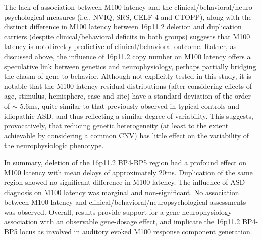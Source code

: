 \documentclass{article}
\begin{document}
\medskip

The lack of association between M100 latency and the clinical/behavioral/neuro-psychological measures (i.e., NVIQ, SRS, CELF-4 and CTOPP), along with the distinct difference in M100 latency between 16p11.2 deletion and duplication carriers (despite clinical/behavioral deficits in both groups) suggests that M100 latency is not directly predictive of clinical/behavioral outcome. Rather, as discussed above, the influence of 16p11.2 copy number on M100 latency offers a speculative link between genetics and neurophysiology, perhaps partially bridging the chasm of gene to behavior. Although not explicitly tested in this study, it is notable that the M100 latency residual distributions (after considering effects of age, stimulus, hemisphere, case and site) have a standard deviation of the order of $\sim$ 5.6ms, quite similar to that previously observed in typical controls and idiopathic ASD, and thus reflecting a similar degree of variability. This suggests, provocatively, that reducing genetic heterogeneity (at least to the extent achievable by considering a common CNV) has little effect on the variability of the neurophysiologic phenotype.  

\medskip

In summary, deletion of the 16p11.2 BP4-BP5 region had a profound effect on M100 latency with mean delays of approximately 20ms.  Duplication of the same region showed no significant difference in M100 latency. The influence of ASD diagnosis on M100 latency was marginal and non-significant. No association between M100 latency and clinical/behavioral/neuropsychological assessments was observed. Overall, results provide support for a gene-neurophysiology association with an observable gene-dosage effect, and implicate the 16p11.2 BP4-BP5 locus as involved in auditory evoked M100 response component generation.  
\end{document}

